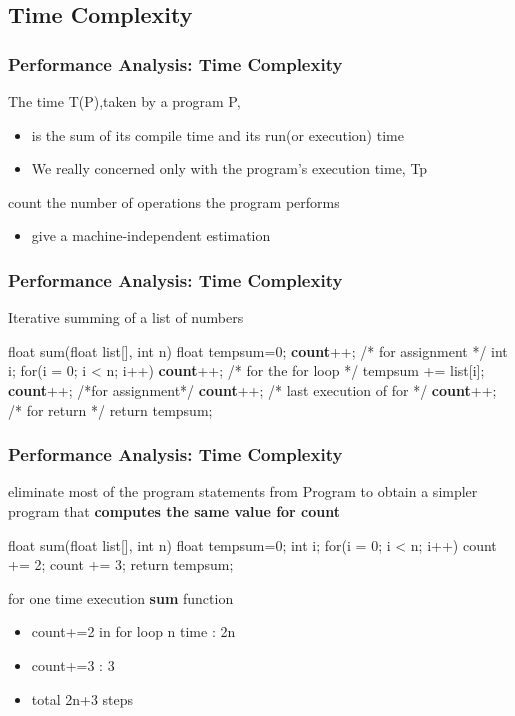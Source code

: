 \documentclass[newPxFont,sthlmFooter,nooffset]{beamer}
\begin{document}
\subsection{Time Complexity}
\begin{frame}[t]
  \frametitle{Performance Analysis: Time Complexity}
The time T(P),taken by a program P,
\begin{itemize}
\item is the sum of its compile time and its run(or execution) time
\item We really concerned only with the program’s execution time, Tp
\end{itemize}


count the number of operations the program performs
  \begin{itemize}
  \item give a machine-independent estimation
  \end{itemize}

\end{frame}


\begin{frame}[t, fragile]
  \frametitle{Performance Analysis: Time Complexity}
Iterative summing of a list of numbers
\begin{codedef}
float sum(float list[], int n) { 
   float tempsum=0;
   \textbf{count}++; /* for assignment */ 
   int i;
   for(i = 0; i < n; i++) { 
      \textbf{count}++; /* for the for loop */ 
      tempsum += list[i];
      \textbf{count}++; /*for assignment*/ 
   }
   \textbf{count}++; /* last execution of for */ 
   \textbf{count}++; /* for return */
   return tempsum;
}
\end{codedef}
\end{frame}


\begin{frame}[t, fragile]
  \frametitle{Performance Analysis: Time Complexity}
eliminate most of the program statements from Program to obtain a simpler program that \textbf{computes the same value for count}
\begin{codedef}
float sum(float list[], int n) {
   float tempsum=0;
   int i;
   for(i = 0; i < n; i++)
      count += 2;
   count += 3;
   return tempsum;
}
\end{codedef}
for one time execution \textbf{sum} function
\begin{itemize}
\item count+=2 in for loop n time : 2n
\item count+=3 : 3
\item total 2n+3 steps
\end{itemize}
\end{frame}
\end{document}
